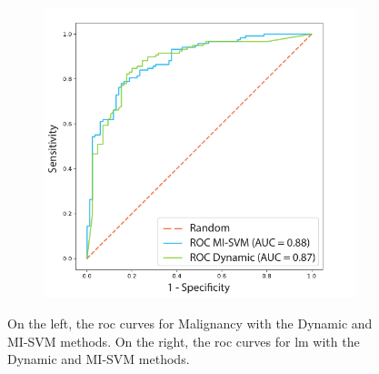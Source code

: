 \documentclass[journal,article,submit,moreauthors,pdftex, applsci]{Definitions/mdpi}
\begin{document}
\begin{figure}[H]
\begin{subfigure}{0.47\linewidth}
        \includegraphics[width=\linewidth]{Figures/Result_LMM.pdf}
    \end{subfigure} 
    \caption{On the left, the \ac{roc} curves for Malignancy with the Dynamic and MI-SVM methods. On the right, the \ac{roc} curves for \ac{lm} with the Dynamic and MI-SVM methods.}
    \label{fig:roc_results}
\end{figure}

\end{document}
